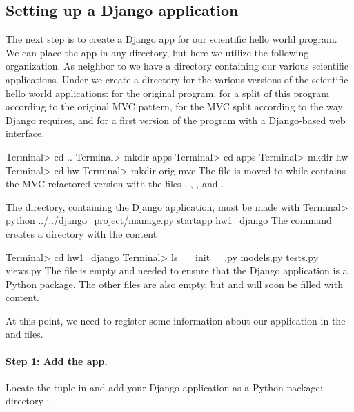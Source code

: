 \documentclass[%
oneside,                 %
final,                   %
10pt]{article}
\begin{document}
{{\subsection{Setting up a Django application}


The next step is to create a Django app for our scientific hello
world program. We can place the app in any directory, but here we
utilize the following organization.
As neighbor to  we have
a directory  containing our various scientific applications.
Under  we create a directory 
for the various versions of the scientific hello world applications:
 for the original  program,  for a split of this
program according to the original MVC pattern,  for
the MVC split according to the way Django requires,
and  for a first version of
the program with a Django-based web interface.

\bsys
Terminal> cd ..
Terminal> mkdir apps
Terminal> cd apps
Terminal> mkdir hw
Terminal> cd hw
Terminal> mkdir orig mvc
\esys
The file  is moved to  while  contains
the MVC refactored version with the files , , ,
and .

The  directory, containing the Django application, must be
made with
\bsys
Terminal> python ../../django_project/manage.py startapp hw1_django
\esys
The command creates a directory  with the content

\bsys
Terminal> cd hw1_django
Terminal> ls
__init__.py models.py tests.py views.py
\esys
The  file is empty and needed to ensure that the
Django application is a Python package. The other files are also
empty, but  and  will soon be filled with content.

At this point,
we need to register some information about our application in the
 and  files.

\paragraph{Step 1: Add the app.}
Locate the 
tuple in  and add your Django application as a Python package:
directory :

}}
\end{document}
